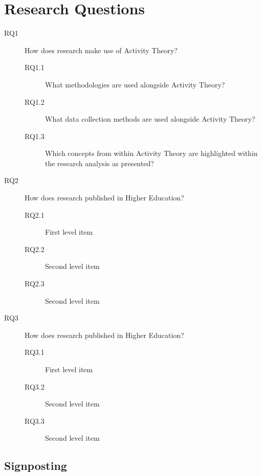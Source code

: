 \documentclass[a4paper,man,natbib]{apa6}
\begin{document}
\section{Research Questions}
\begin{description}
    \item[RQ1]How does research make use of Activity Theory?
    \begin{description}
        \item[RQ1.1]What methodologies are used alongside Activity Theory?
        \item[RQ1.2]What data collection methods are used alongside Activity Theory?
        \item[RQ1.3]Which concepts from within Activity Theory are highlighted within the research analysis as presented?
    \end{description}
\end{description}

\begin{description}
   \item[RQ2] How does research published in Higher Education? 
   \begin{description}
      \item[RQ2.1] First level item
      \item[RQ2.2] Second level item
      \item[RQ2.3] Second level item
   \end{description}
\end{description}
\begin{description}
   \item[RQ3] How does research published in Higher Education? 
   \begin{description}
      \item[RQ3.1] First level item
      \item[RQ3.2] Second level item
      \item[RQ3.3] Second level item
   \end{description}
\end{description}

\newpage

\subsection{Signposting}
\end{document}

